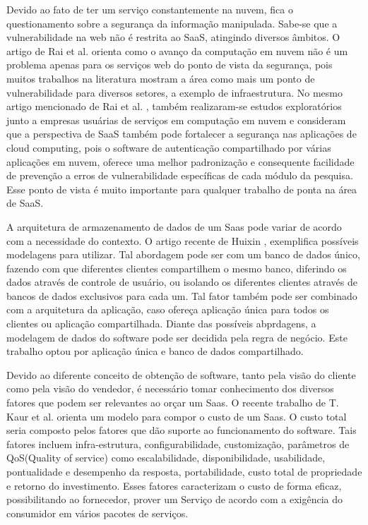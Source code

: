 Devido ao fato de ter um serviço constantemente na nuvem, fica o questionamento sobre a segurança da informação manipulada. Sabe-se que a vulnerabilidade na web não é restrita ao SaaS, atingindo diversos âmbitos. O artigo de Rai et al. \cite{journals/corr/RaiSM13} orienta como o avanço da computação em nuvem não é um problema apenas para os serviços web do ponto de vista da segurança, pois muitos trabalhos na literatura mostram a área como mais um ponto de vulnerabilidade para diversos setores, a exemplo de infraestrutura. No mesmo artigo mencionado de Rai et al. \cite{journals/corr/RaiSM13}, também realizaram-se estudos exploratórios junto a empresas usuárias de serviços em computação em nuvem e consideram que a perspectiva de SaaS também pode fortalecer a segurança nas aplicações de cloud computing, pois o software de autenticação compartilhado por várias aplicações em nuvem, oferece uma melhor padronização e consequente facilidade de prevenção a erros de vulnerabilidade específicas de cada módulo da pesquisa. Esse ponto de vista é muito importante para qualquer trabalho de ponta na área de SaaS.


A arquitetura de armazenamento de dados de um Saas pode variar de acordo com a necessidade do contexto. O artigo recente de Huixin \cite{7586486}, exemplifica possíveis modelagens para utilizar. Tal abordagem pode ser com um banco de dados único, fazendo com que diferentes clientes compartilhem o mesmo banco, diferindo os dados através de controle de usuário, ou isolando os diferentes clientes através de bancos de dados exclusivos para cada um. Tal fator também pode ser combinado com a arquitetura da aplicação, caso ofereça aplicação única para todos os clientes ou aplicação compartilhada. Diante das possíveis abprdagens, a modelagem de dados do software pode ser decidida pela regra de negócio. Este trabalho optou por aplicação única e banco de dados compartilhado.


Devido ao diferente conceito de obtenção de software, tanto pela visão do cliente como pela visão do vendedor, é necessário tomar conhecimento dos diversos fatores que podem ser relevantes ao orçar um Saas. O recente trabalho de T. Kaur et al. \citep{6949281} orienta um modelo para compor o custo de um Saas. O custo total seria composto pelos fatores que dão suporte ao funcionamento do software. Tais fatores incluem infra-estrutura, configurabilidade, customização, parâmetros de QoS(Quality of service) como escalabilidade, disponibilidade, usabilidade, pontualidade e desempenho da resposta, portabilidade, custo total de propriedade e retorno do investimento. Esses fatores caracterizam o custo de forma eficaz, possibilitando ao fornecedor, prover um Serviço de acordo com a exigência do consumidor em vários pacotes de serviços.


